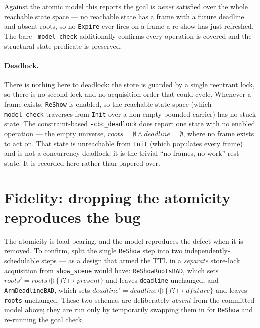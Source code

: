 \documentclass[a4paper,10pt,fleqn]{article}
\begin{document}
Against the atomic model this reports the goal is \emph{never} satisfied over the
whole reachable state space --- no reachable state has a frame with a future
deadline and absent roots, so no \texttt{Expire} ever fires on a frame a re-show
has just refreshed. The bare \texttt{-model\_check} additionally confirms every
operation is covered and the structural state predicate is preserved.

\paragraph{Deadlock.} There is nothing here to deadlock: the store is guarded by a
single reentrant lock, so there is no second lock and no acquisition order that
could cycle. Whenever a frame exists, \texttt{ReShow} is enabled, so the reachable
state space (which \texttt{-model\_check} traverses from \texttt{Init} over a
non-empty bounded carrier) has no stuck state. The constraint-based
\texttt{-cbc\_deadlock} does report one state with no enabled operation --- the
empty universe, $roots = \emptyset \land deadline = \emptyset$, where no frame
exists to act on. That state is unreachable from \texttt{Init} (which populates
every frame) and is not a concurrency deadlock; it is the trivial ``no frames, no
work'' rest state. It is recorded here rather than papered over.

\section{Fidelity: dropping the atomicity reproduces the bug}
\label{sec:fidelity}

The atomicity is load-bearing, and the model reproduces the defect when it is
removed. To confirm, split the single \texttt{ReShow} step into two
independently-schedulable steps --- as a design that armed the TTL in a
\emph{separate} store-lock acquisition from \texttt{show\_scene} would have:
\texttt{ReShowRootsBAD}, which sets $roots' = roots \oplus \{ f? \mapsto present \}$
and leaves \texttt{deadline} unchanged, and \texttt{ArmDeadlineBAD}, which sets
$deadline' = deadline \oplus \{ f? \mapsto dfuture \}$ and leaves \texttt{roots}
unchanged. These two schemas are deliberately \emph{absent} from the committed model above;
they are run only by temporarily swapping them in for \texttt{ReShow} and re-running
the goal check.
\end{document}
